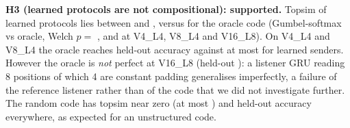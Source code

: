 \textbf{H3 (learned protocols are not compositional): supported.} Topsim of learned protocols lies between  and , versus  for the oracle code (Gumbel-softmax vs oracle, Welch $p=$ ,  and  at V4\_L4, V8\_L4 and V16\_L8). On V4\_L4 and V8\_L4 the oracle reaches  held-out accuracy against at most  for learned senders. However the oracle is \emph{not} perfect at V16\_L8 (held-out ): a listener GRU reading 8 positions of which 4 are constant padding generalises imperfectly, a failure of the reference listener rather than of the code that we did not investigate further. The random code has topsim near zero (at most ) and held-out accuracy  everywhere, as expected for an unstructured code.


